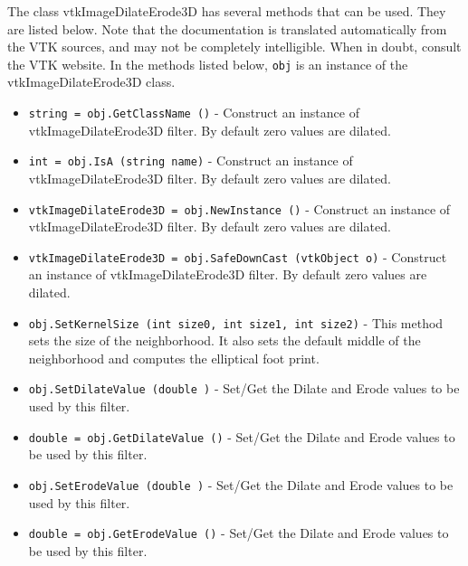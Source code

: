 The class vtkImageDilateErode3D has several methods that can be used.
  They are listed below.
Note that the documentation is translated automatically from the VTK sources,
and may not be completely intelligible.  When in doubt, consult the VTK website.
In the methods listed below, \verb|obj| is an instance of the vtkImageDilateErode3D class.
\begin{itemize}
\item  \verb|string = obj.GetClassName ()| -  Construct an instance of vtkImageDilateErode3D filter.
 By default zero values are dilated.

\item  \verb|int = obj.IsA (string name)| -  Construct an instance of vtkImageDilateErode3D filter.
 By default zero values are dilated.

\item  \verb|vtkImageDilateErode3D = obj.NewInstance ()| -  Construct an instance of vtkImageDilateErode3D filter.
 By default zero values are dilated.

\item  \verb|vtkImageDilateErode3D = obj.SafeDownCast (vtkObject o)| -  Construct an instance of vtkImageDilateErode3D filter.
 By default zero values are dilated.

\item  \verb|obj.SetKernelSize (int size0, int size1, int size2)| -  This method sets the size of the neighborhood.  It also sets the 
 default middle of the neighborhood and computes the elliptical foot print.

\item  \verb|obj.SetDilateValue (double )| -  Set/Get the Dilate and Erode values to be used by this filter.

\item  \verb|double = obj.GetDilateValue ()| -  Set/Get the Dilate and Erode values to be used by this filter.

\item  \verb|obj.SetErodeValue (double )| -  Set/Get the Dilate and Erode values to be used by this filter.

\item  \verb|double = obj.GetErodeValue ()| -  Set/Get the Dilate and Erode values to be used by this filter.

\end{itemize}
